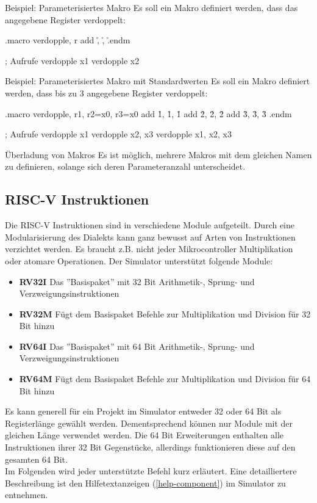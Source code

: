\begin{exampleblock}{Beispiel: Parameterisiertes Makro}
	Es soll ein Makro definiert werden, dass das angegebene Register verdoppelt:
	\begin{riscv}
		.macro verdopple, r
		add \r, \r, \r
		.endm

		; Aufrufe
		verdopple x1
		verdopple x2
	\end{riscv}
\end{exampleblock}

\begin{exampleblock}{Beispiel: Parameterisiertes Makro mit Standardwerten}
	Es soll ein Makro definiert werden, dass bis zu 3 angegebene Register
	verdoppelt:
	\begin{riscv}
		.macro verdopple, r1, r2=x0, r3=x0
		add \r1, \r1, \r1
		add \r2, \r2, \r2
		add \r3, \r3, \r3
		.endm

		; Aufrufe
		verdopple x1
		verdopple x2, x3
		verdopple x1, x2, x3
	\end{riscv}
\end{exampleblock}

\begin{infoblock}{Überladung von Makros}
	Es ist möglich, mehrere Makros mit dem gleichen Namen zu definieren, solange
	sich deren Parameteranzahl unterscheidet.
\end{infoblock}

\subsection{RISC-V Instruktionen}
Die RISC-V Instruktionen sind in verschiedene Module aufgeteilt. Durch eine Modularisierung des Dialekts kann ganz bewusst auf Arten von Instruktionen verzichtet werden. Es braucht z.B. nicht jeder Mikrocontroller Multiplikation oder atomare Operationen. Der Simulator unterstützt folgende Module:\\
\begin{itemize}
	\item \textbf{RV32I} Das ''Basispaket'' mit 32 Bit Arithmetik-, Sprung- und Verzweigungsinstruktionen
	\item\textbf{ RV32M} Fügt dem Basispaket Befehle zur Multiplikation und Division für 32 Bit hinzu
	\item \textbf{RV64I} Das ''Basispaket'' mit 64 Bit Arithmetik-, Sprung- und Verzweigungsinstruktionen
	\item \textbf{RV64M} Fügt dem Basispaket Befehle zur Multiplikation und Division für 64 Bit hinzu
\end{itemize}
Es kann generell für ein Projekt im Simulator entweder 32 oder 64 Bit als Registerlänge gewählt werden. Dementsprechend können nur Module mit der gleichen Länge verwendet werden. Die 64 Bit Erweiterungen enthalten alle Instruktionen ihrer 32 Bit Gegenstücke, allerdings funktionieren diese auf den gesamten 64 Bit.\\
Im Folgenden wird jeder unterstützte Befehl kurz erläutert. Eine detailliertere Beschreibung ist den Hilfetextanzeigen (\autoref{help-component}) im Simulator zu entnehmen.\\

